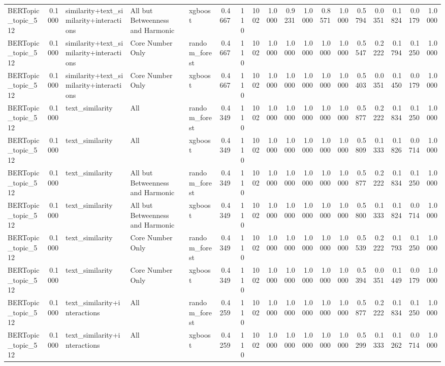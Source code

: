 \begin{tabular}{lrlllrrrrrrrrrrrrr}
BERTopic_topic_512 & 0.1000 & similarity+text_similarity+interactions & All but Betweenness and Harmonic & xgboost & 0.4667 & 110 & 1002 & 1.0000 & 0.9231 & 1.0000 & 0.8571 & 1.0000 & 0.5794 & 0.0351 & 0.1824 & 0.0179 & 1.0000 \\
BERTopic_topic_512 & 0.1000 & similarity+text_similarity+interactions & Core Number Only & random_forest & 0.4667 & 110 & 1002 & 1.0000 & 1.0000 & 1.0000 & 1.0000 & 1.0000 & 0.5547 & 0.2222 & 0.1794 & 0.1250 & 1.0000 \\
BERTopic_topic_512 & 0.1000 & similarity+text_similarity+interactions & Core Number Only & xgboost & 0.4667 & 110 & 1002 & 1.0000 & 1.0000 & 1.0000 & 1.0000 & 1.0000 & 0.5403 & 0.0351 & 0.1450 & 0.0179 & 1.0000 \\
BERTopic_topic_512 & 0.1000 & text_similarity & All & random_forest & 0.4349 & 110 & 1002 & 1.0000 & 1.0000 & 1.0000 & 1.0000 & 1.0000 & 0.5877 & 0.2222 & 0.1834 & 0.1250 & 1.0000 \\
BERTopic_topic_512 & 0.1000 & text_similarity & All & xgboost & 0.4349 & 110 & 1002 & 1.0000 & 1.0000 & 1.0000 & 1.0000 & 1.0000 & 0.5809 & 0.1333 & 0.1826 & 0.0714 & 1.0000 \\
BERTopic_topic_512 & 0.1000 & text_similarity & All but Betweenness and Harmonic & random_forest & 0.4349 & 110 & 1002 & 1.0000 & 1.0000 & 1.0000 & 1.0000 & 1.0000 & 0.5877 & 0.2222 & 0.1834 & 0.1250 & 1.0000 \\
BERTopic_topic_512 & 0.1000 & text_similarity & All but Betweenness and Harmonic & xgboost & 0.4349 & 110 & 1002 & 1.0000 & 1.0000 & 1.0000 & 1.0000 & 1.0000 & 0.5800 & 0.1333 & 0.1824 & 0.0714 & 1.0000 \\
BERTopic_topic_512 & 0.1000 & text_similarity & Core Number Only & random_forest & 0.4349 & 110 & 1002 & 1.0000 & 1.0000 & 1.0000 & 1.0000 & 1.0000 & 0.5539 & 0.2222 & 0.1793 & 0.1250 & 1.0000 \\
BERTopic_topic_512 & 0.1000 & text_similarity & Core Number Only & xgboost & 0.4349 & 110 & 1002 & 1.0000 & 1.0000 & 1.0000 & 1.0000 & 1.0000 & 0.5394 & 0.0351 & 0.1449 & 0.0179 & 1.0000 \\
BERTopic_topic_512 & 0.1000 & text_similarity+interactions & All & random_forest & 0.4259 & 110 & 1002 & 1.0000 & 1.0000 & 1.0000 & 1.0000 & 1.0000 & 0.5877 & 0.2222 & 0.1834 & 0.1250 & 1.0000 \\
BERTopic_topic_512 & 0.1000 & text_similarity+interactions & All & xgboost & 0.4259 & 110 & 1002 & 1.0000 & 1.0000 & 1.0000 & 1.0000 & 1.0000 & 0.5299 & 0.1333 & 0.1262 & 0.0714 & 1.0000 \\

\end{tabular}
